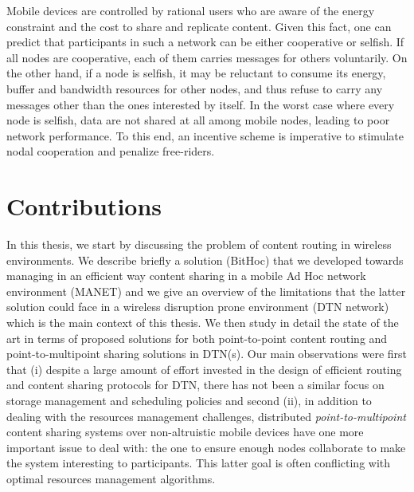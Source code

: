 Mobile devices are controlled by rational users who are aware of the energy constraint and the cost to share and replicate content. Given this fact, one can predict that participants in such a network can be either
cooperative or selfish. If all nodes are cooperative, each of them carries messages for others voluntarily. On the other hand, if a node is selfish, it may be reluctant to consume its energy, buffer and bandwidth resources for other nodes, and thus refuse to carry any messages other than the ones interested by itself. In the worst case where every node is selfish, data are not shared at all among mobile nodes, leading to poor network performance. To this end, an incentive scheme is imperative to stimulate nodal cooperation and penalize free-riders.

\section{Contributions}

In this thesis, we start by discussing the problem of content routing in wireless environments. We describe briefly a solution (BitHoc) that we developed towards managing in an efficient way content sharing in a mobile Ad Hoc network environment (MANET) and we give an overview of the limitations that the latter solution could face in a wireless disruption prone environment (DTN network) which is the main context of this thesis. We then study in detail the state of the art in terms of proposed solutions for both point-to-point content routing and point-to-multipoint sharing solutions in DTN(s). Our main observations were first that (i) despite a large amount of effort invested in the design of efficient routing and content sharing protocols for DTN, there has not been a similar focus on storage management and scheduling policies and second (ii), in addition to dealing with the resources management challenges, distributed \emph{point-to-multipoint} content sharing systems over non-altruistic mobile devices have one more important issue to deal with: the one to ensure enough nodes collaborate to make the system interesting to participants. This latter goal is often conflicting with optimal resources management algorithms. 

